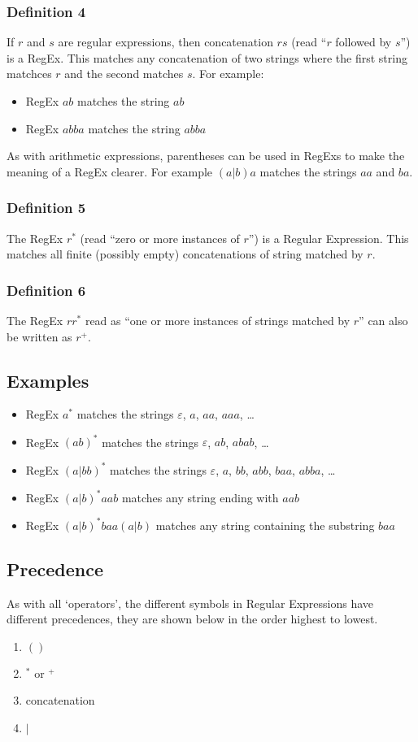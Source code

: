 \subsubsection{Definition 4}
If $r$ and $s$ are regular expressions, then concatenation $rs$ (read ``$r$ followed by $s$'') is a RegEx. This matches any concatenation of two strings where the first string matchces $r$ and the second matches $s$. For example: 
\begin{itemize}
    \item RegEx $ab$ matches the string $ab$
    \item RegEx $abba$ matches the string $abba$
\end{itemize}
As with arithmetic expressions, parentheses can be used in RegExs to make the meaning of a RegEx clearer. For example $(a|b)a$ matches the strings $aa$ and $ba$. 

\subsubsection{Definition 5}
The RegEx $r^*$ (read ``zero or more instances of $r$'') is a Regular Expression. This matches all finite (possibly empty) concatenations of string matched by $r$.

\subsubsection{Definition 6}
The RegEx $rr^*$ read as ``one or more instances of strings matched by $r$'' can also be written as $r^+$. 

\subsection{Examples}
\begin{itemize}
    \item RegEx $a^*$ matches the strings $\varepsilon$, $a$, $aa$, $aaa$, \ldots
    \item RegEx $(ab)^*$ matches the strings $\varepsilon$, $ab$, $abab$, \ldots
    \item RegEx $(a|bb)^*$ matches the strings $\varepsilon$, $a$, $bb$, $abb$, $baa$, $abba$, \ldots
    \item RegEx $(a|b)^*aab$ matches any string ending with $aab$
    \item RegEx $(a|b)^*baa(a|b)$ matches any string containing the substring $baa$
\end{itemize}

\subsection{Precedence}
As with all `operators', the different symbols in Regular Expressions have different precedences, they are shown below in the order highest to lowest.
\begin{enumerate}
    \item $()$
    \item $^*$ or $^+$
    \item concatenation
    \item $|$
\end{enumerate}


